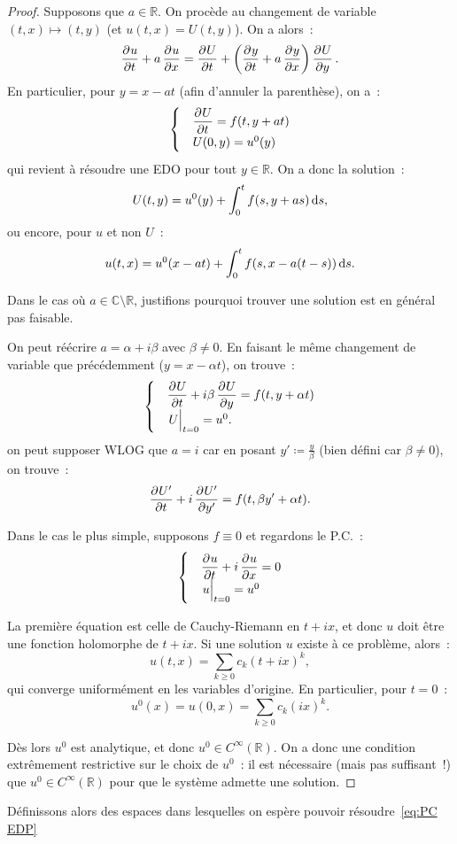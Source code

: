 \documentclass{report}
\newcommand{\C}{{\mathbb C}}
\newcommand{\R}{{\mathbb R}}
\newcommand{\restr}[2]{\left.#1\vphantom{\big|}\right|_{#2}}
\theoremstyle{definition}
\theoremstyle{remark}
\begin{document}
\begin{proof} Supposons que $a \in \R$. On procède au changement de variable $(t, x) \mapsto (t, y)$ (et $u(t, x) = U(t, y)$). On a alors~:
\[\dpd ut + a \dpd ux = \dpd Ut + \left(\dpd yt + a\dpd yx\right)\dpd Uy.\]
En particulier, pour $y = x - at$ (afin d'annuler la parenthèse), on a~:
\[\begin{cases}&\dpd Ut = f(t, y+at)\\&U(0, y) = u^0(y)\end{cases}\]
qui revient à résoudre une EDO pour tout $y \in \R$. On a donc la solution~:
\[U(t, y) = u^0(y) + \int_0^tf(s, y+as)\dif s,\]
ou encore, pour $u$ et non $U$~:
\[u(t, x) = u^0(x-at) + \int_0^tf(s, x-a(t-s))\dif s.\]

Dans le cas où $a \in \C \setminus \R$, justifions pourquoi trouver une solution est en général pas faisable.

On peut réécrire $a = \alpha + i\beta$ avec $\beta \neq 0$. En faisant le même changement de variable que précédemment ($y = x-\alpha t$), on trouve~:
\[\begin{cases}&\dpd Ut + i\beta\dpd Uy = f(t, y+\alpha t)\\&\restr U{t=0} = u^0.\end{cases}\]
on peut supposer WLOG que $a = i$ car en posant $y' \coloneqq \frac y\beta$ (bien défini car $\beta \neq 0$), on trouve~:
\[\dpd {U'}t + i\dpd {U'}{y'} = f(t, \beta y' + \alpha t).\]

Dans le cas le plus simple, supposons $f \equiv 0$ et regardons le P.C.~:
\[\begin{cases}&\dpd ut + i\dpd ux = 0\\&\restr u{t=0} = u^0\end{cases}\]

La première équation est celle de Cauchy-Riemann en $t + ix$, et donc $u$ doit être une fonction holomorphe de $t + ix$. Si une solution $u$ existe à ce problème, alors~:
\[u(t, x) = \sum_{k \geq 0}c_k(t+ix)^k,\]
qui converge uniformément en les variables d'origine. En particulier, pour $t=0$~:
\[u^0(x) = u(0, x) = \sum_{k \geq 0}c_k(ix)^k.\]

Dès lors $u^0$ est analytique, et donc $u^0 \in C^\infty(\R)$. On a donc une condition extrêmement restrictive sur le choix de $u^0$~: il est nécessaire (mais pas suffisant~!)
que $u^0 \in C^\infty(\R)$ pour que le système admette une solution.
\end{proof}

Définissons alors des espaces dans lesquelles on espère pouvoir résoudre~\eqref{eq:PC EDP}
\end{document}
